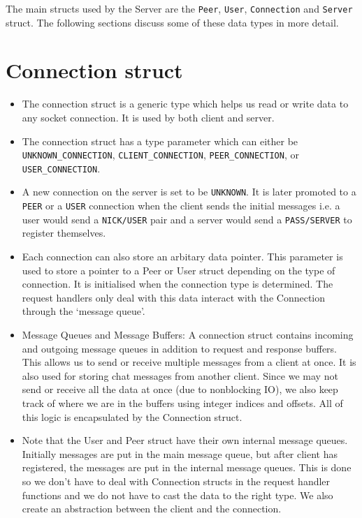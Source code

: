 \documentclass[letterpaper,twocolumn,10pt]{article}
\begin{document}
The main structs used by the Server are the \verb|Peer|, \verb|User|,
\verb|Connection| and \verb|Server| struct. The following sections discuss
some of these data types in more detail.

\section{Connection struct}

\begin{itemize}
	\item The connection struct is a generic type which helps us read or write
	      data to
	      any socket connection. It is used by both client and server.
	\item The connection struct has a type parameter which can either be
	      \verb|UNKNOWN_CONNECTION|, \verb|CLIENT_CONNECTION|, \verb|PEER_CONNECTION|, or
	      \verb|USER_CONNECTION|.
	\item A new connection on the server is set to be \verb|UNKNOWN|. It is
	      later
	      promoted to a \verb|PEER| or a \verb|USER| connection when the client
	      sends the
	      initial messages i.e. a user would send a \verb|NICK/USER| pair and a
	      server
	      would send a \verb|PASS/SERVER| to register themselves.
	\item Each connection can also store an arbitary data pointer. This
	      parameter is
	      used to store a pointer to a Peer or User struct depending on the type
	      of
	      connection. It is initialised when the connection type is determined.
	      The
	      request handlers only deal with this data interact with the Connection
	      through
	      the `message queue'.
	\item Message Queues and Message Buffers: A connection struct contains
	      incoming and
	      outgoing message queues in addition to request and response buffers.
	      This
	      allows us to send or receive multiple messages from a client at once.
	      It is
	      also used for storing chat messages from another client. Since we may
	      not send
	      or receive all the data at once (due to nonblocking IO), we also keep
	      track of
	      where we are in the buffers using integer indices and offsets. All of
	      this
	      logic is encapsulated by the Connection struct.
	\item Note that the User and Peer struct have their own internal message
	      queues.
	      Initially messages are put in the main message queue, but after client
	      has
	      registered, the messages are put in the internal message queues. This
	      is done
	      so we don't have to deal with Connection structs in the request handler
	      functions and we do not have to cast the data to the right type. We
	      also create
	      an abstraction between the client and the connection.
\end{itemize}
\end{document}
